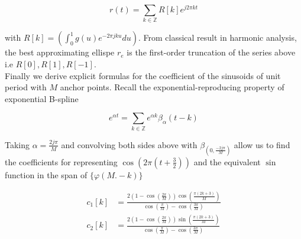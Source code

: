 \documentclass[a4paper, 11pt]{article}
\begin{document}
\begin{equation}
  r(t) = \sum_{k \in \mathbb{Z}} R[k] e^{j2\pi kt}
\end{equation}

with $R[k] = \left(\int_{0}^{1} g(u)e^{-2\pi j ku}du\right)$. From classical result in harmonic analysis, the best 
approximating ellispe $r_e$ is the first-order truncation of the series above i.e $R[0], R[1], R[-1]$. \\

Finally we derive explicit formulas for the coefficient of the sinusoids of unit period with $M$ anchor points. Recall 
the exponential-reproducing property of exponential B-spline

\begin{equation}
  e^{\alpha t} = \sum_{k \in \mathbb{Z}} e^{\alpha k} \beta_{\alpha}(t-k)
\end{equation}


Taking $\alpha = \frac{2j\pi}{M}$ and convolving both sides above with $\beta_{(0, \frac{-2j\pi}{M})}$ allow us to find 
the coefficients for representing $\cos (2\pi (t+\frac{3}{2}))$ and the equivalent $\sin$ function in the span of
${\{\varphi(M.-k)\}}$

\begin{align}
  c_1[k] &= \frac{2(1-\cos (\frac{2\pi}{M}))\cos (\frac{\pi(2k+3)}{M})}{\cos (\frac{\pi}{M}) - \cos (\frac{3\pi}{M})} \\
  c_2[k] &= \frac{2(1-\cos (\frac{2\pi}{M}))\sin (\frac{\pi(2k+3)}{M})}{\cos (\frac{\pi}{M}) - \cos (\frac{3\pi}{M})}
\end{align}
\end{document}
